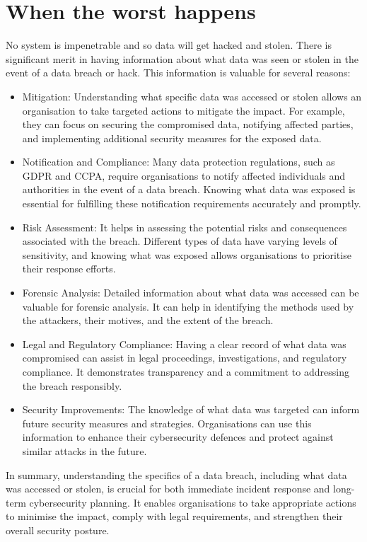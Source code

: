 \documentclass{tufte-handout}
\begin{document}
\section{When the worst happens}\label{sec:page-layout}

No system is impenetrable and so data will get hacked and stolen. There is significant merit in having information about what data was seen or stolen in the event of a data breach or hack.
This information is valuable for several reasons:
\begin{itemize}
\item Mitigation: Understanding what specific data was accessed or stolen allows an organisation to take targeted actions to mitigate the impact. For example, they can focus on securing the compromised data, notifying affected parties, and implementing additional security measures for the exposed data.
\item Notification and Compliance: Many data protection regulations, such as GDPR and CCPA, require organisations to notify affected individuals and authorities in the event of a data breach. Knowing what data was exposed is essential for fulfilling these notification requirements accurately and promptly.
\item Risk Assessment: It helps in assessing the potential risks and consequences associated with the breach. Different types of data have varying levels of sensitivity, and knowing what was exposed allows organisations to prioritise their response efforts.
\item Forensic Analysis: Detailed information about what data was accessed can be valuable for forensic analysis. It can help in identifying the methods used by the attackers, their motives, and the extent of the breach.
\item Legal and Regulatory Compliance: Having a clear record of what data was compromised can assist in legal proceedings, investigations, and regulatory compliance. It demonstrates transparency and a commitment to addressing the breach responsibly.
\item Security Improvements: The knowledge of what data was targeted can inform future security measures and strategies. Organisations can use this information to enhance their cybersecurity defences and protect against similar attacks in the future.
\end{itemize}
In summary, understanding the specifics of a data breach, including what data was accessed or stolen, is crucial for both immediate incident response and long-term cybersecurity planning. It enables organisations to take appropriate actions to minimise the impact, comply with legal requirements, and strengthen their overall security posture.
\end{document}
